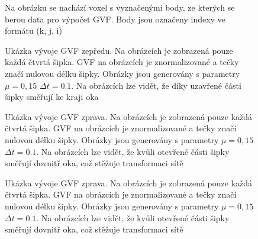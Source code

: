\begin{figure}[ht]
	\centering
	\caption[Voxel]{Na obrázku se nachází voxel s vyznačenými body, ze kterých se berou data pro výpočet GVF. Body jsou označeny indexy ve formátu (k, j, i)}
	\label{voxel}
\end{figure}

\begin{figure}[ht]
	\centering
	\hspace{3em}
	\caption[Ukázka vývoje GVF zepředu]{Ukázka vývoje GVF zepředu. Na obrázcích je zobrazená pouze každá čtvrtá šipka. GVF na obrázcích je znormalizované a tečky značí nulovou délku šipky. Obrázky jsou generovány s parametry $\mu = 0,15$ $\Delta t = 0.1$. Na obrázcích lze vidět, že díky uzavřené části šipky směřují ke kraji oka }
	\label{gvf-development-xy}
\end{figure}

\begin{figure}[ht]
	\centering
	\hspace{3em}
	\caption[Ukázka vývoje GVF zprava 1]{Ukázka vývoje GVF zprava. Na obrázcích je zobrazená pouze každá čtvrtá šipka. GVF na obrázcích je znormalizované a tečky značí nulovou délku šipky. Obrázky jsou generovány s parametry $\mu = 0,15$ $\Delta t = 0.1$. Na obrázcích lze vidět, že kvůli otevřené části šipky směřují dovnitř oka, což stěžuje transformaci sítě }
	\label{gvf-development-zy-1}
\end{figure}

\begin{figure}[ht]
	\centering
	\hspace{3em}
	\caption[Ukázka vývoje GVF zprava 2]{Ukázka vývoje GVF zprava. Na obrázcích je zobrazená pouze každá čtvrtá šipka. GVF na obrázcích je znormalizované a tečky značí nulovou délku šipky. Obrázky jsou generovány s parametry $\mu = 0,15$ $\Delta t = 0.1$. Na obrázcích lze vidět, že kvůli otevřené části šipky směřují dovnitř oka, což stěžuje transformaci sítě }
	\label{gvf-development-zy-2}
\end{figure}

